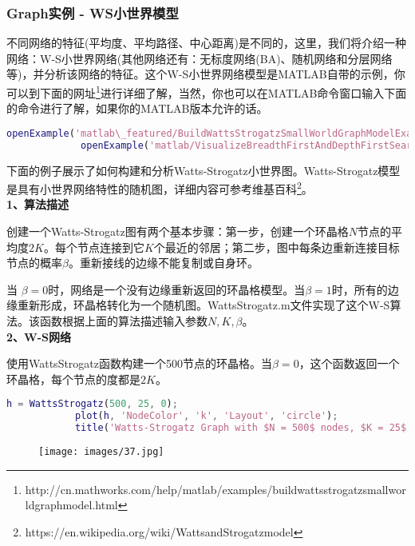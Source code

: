         \subsubsection{Graph实例 - WS小世界模型}
             不同网络的特征(平均度、平均路径、中心距离)是不同的，这里，我们将介绍一种网络：W-S小世界网络(其他网络还有：无标度网络(BA)、随机网络和分层网络等)，并分析该网络的特征。这个W-S小世界网络模型是MATLAB自带的示例，你可以到下面的网址\footnote{http://cn.mathworks.com/help/matlab/examples/buildwattsstrogatzsmallworldgraphmodel.html}进行详细了解，当然，你也可以在MATLAB命令窗口输入下面的命令进行了解，如果你的MATLAB版本允许的话。
             \begin{lstlisting}[language = Matlab]
             openExample('matlab\_featured/BuildWattsStrogatzSmallWorldGraphModelExample')
             openExample('matlab/VisualizeBreadthFirstAndDepthFirstSearchExample')
             \end{lstlisting}
             \par
            下面的例子展示了如何构建和分析Watts-Strogatz小世界图。Watts-Strogatz模型是具有小世界网络特性的随机图，详细内容可参考维基百科\footnote{https://en.wikipedia.org/wiki/WattsandStrogatzmodel}。\\
            \textbf{1、算法描述}
            \par
            创建一个Watts-Strogatz图有两个基本步骤：第一步，创建一个环晶格$N$节点的平均度$2K$。每个节点连接到它$K$个最近的邻居；第二步，图中每条边重新连接目标节点的概率$\beta$。重新接线的边缘不能复制或自身环。
            \par
            当 $\beta = 0$时，网络是一个没有边缘重新返回的环晶格模型。当$\beta = 1$时，所有的边缘重新形成，环晶格转化为一个随机图。WattsStrogatz.m文件实现了这个W-S算法。该函数根据上面的算法描述输入参数$N,K,\beta$。\\
            \textbf{2、W-S网络}
            \par
            使用WattsStrogatz函数构建一个500节点的环晶格。当$\beta=0$，这个函数返回一个环晶格，每个节点的度都是$2K$。
            \begin{lstlisting}[language=Matlab]
            h = WattsStrogatz(500, 25, 0);
            plot(h, 'NodeColor', 'k', 'Layout', 'circle');
            title('Watts-Strogatz Graph with $N = 500$ nodes, $K = 25$, and $\beta = 0$','Interpreter','latex')
            \end{lstlisting}
            \begin{figure}[H]
            \centering
            \texttt{[image: images/37.jpg]}
            \end{figure}
